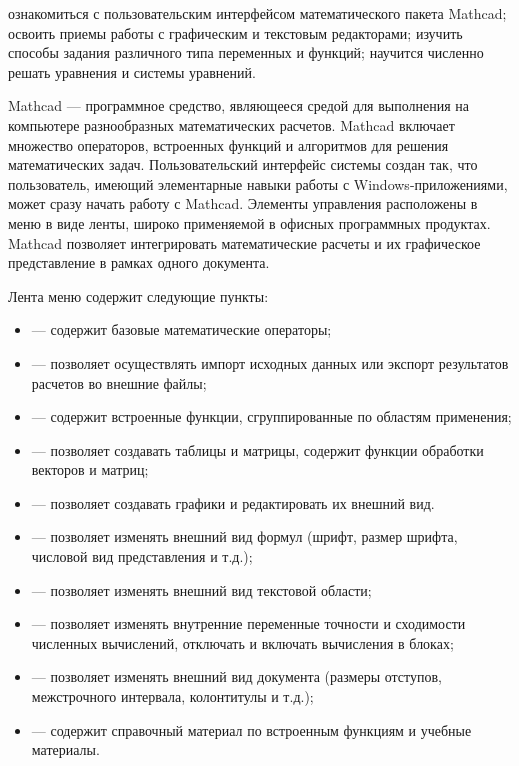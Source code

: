 
\goal ознакомиться с пользовательским интерфейсом математического пакета Mathcad; освоить приемы работы с графическим и текстовым редакторами; изучить способы задания различного типа переменных и функций;  научится численно решать уравнения и системы уравнений.

Mathcad --- программное средство, являющееся средой для выполнения на компьютере разнообразных математических расчетов. Mathcad включает множество операторов, встроенных функций и алгоритмов для решения  математических задач. Пользовательский интерфейс системы создан так, что пользователь, имеющий элементарные навыки работы с Windows-приложениями, может сразу начать работу с Mathcad. Элементы управления расположены в меню в виде ленты, широко применяемой в офисных программных продуктах. Mathcad позволяет интегрировать математические расчеты и их графическое представление в рамках одного документа.

Лента меню содержит следующие пункты:
\begin{itemize}
	\item {} --- содержит базовые математические операторы;
	\item {} --- позволяет осуществлять импорт исходных данных или экспорт результатов расчетов во внешние файлы;
	\item {} --- содержит встроенные функции, сгруппированные по областям применения;
	\item {} --- позволяет создавать таблицы и матрицы, содержит функции обработки векторов и матриц;
	\item  {} --- позволяет создавать графики и редактировать их внешний вид.
	\item {} --- позволяет изменять внешний вид формул (шрифт, размер шрифта, числовой вид представления и т.д.);
	\item {} --- позволяет изменять внешний вид текстовой области;
	\item {} --- позволяет изменять внутренние переменные точности и сходимости численных вычислений, отключать и включать вычисления в блоках;
	\item {} --- позволяет изменять внешний вид документа (размеры отступов, межстрочного интервала, колонтитулы и т.д.);
	\item {} --- содержит справочный материал по встроенным функциям и учебные материалы.
\end{itemize} 

